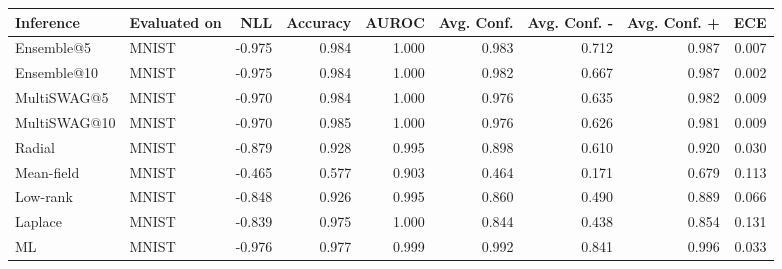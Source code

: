 
\begin{tabular}{llrrrrrrr}
\toprule
Inference & Evaluated on & NLL & Accuracy & AUROC & Avg. Conf. & Avg. Conf. - & Avg. Conf. + & ECE \\
\midrule
Ensemble@5 & MNIST & -0.975 & 0.984 & 1.000 & 0.983 & 0.712 & 0.987 & 0.007 \\
Ensemble@10 & MNIST & -0.975 & 0.984 & 1.000 & 0.982 & 0.667 & 0.987 & 0.002 \\
MultiSWAG@5 & MNIST & -0.970 & 0.984 & 1.000 & 0.976 & 0.635 & 0.982 & 0.009 \\
MultiSWAG@10 & MNIST & -0.970 & 0.985 & 1.000 & 0.976 & 0.626 & 0.981 & 0.009 \\
Radial & MNIST & -0.879 & 0.928 & 0.995 & 0.898 & 0.610 & 0.920 & 0.030 \\
Mean-field & MNIST & -0.465 & 0.577 & 0.903 & 0.464 & 0.171 & 0.679 & 0.113 \\
Low-rank & MNIST & -0.848 & 0.926 & 0.995 & 0.860 & 0.490 & 0.889 & 0.066 \\
Laplace & MNIST & -0.839 & 0.975 & 1.000 & 0.844 & 0.438 & 0.854 & 0.131 \\
ML & MNIST & -0.976 & 0.977 & 0.999 & 0.992 & 0.841 & 0.996 & 0.033 \\
\bottomrule
\end{tabular}

